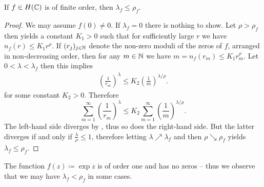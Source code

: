 \begin{theorem} \label{thm:inequality-order-exponent-of-convergence}
    If $f \in H(\mathbb{C})$ is of finite order, then $\lambda_f \leq \rho_f$.
\end{theorem}

\begin{proof}
    We may assume $f(0) \neq 0$. If $\lambda_f = 0$ there is nothing to show. Let $\rho > \rho_f$ then  yields a constant $K_1 > 0$ such that for sufficiently large $r$ we have $n_f(r) \leq K_1 r^{\rho}$. If $(r_j)_{j \in \mathbb{N}}$ denote the non-zero moduli of the zeros of $f$, arranged in non-decreasing order, then for any $m \in \mathbb{N}$ we have $m = n_f(r_m) \leq K_1 r_m^{\rho}$. Let $0 < \lambda < \lambda_f$ then this implies
    \begin{align*}
        \left( \frac{1}{r_m} \right)^{\lambda} \leq K_2 \left( \frac{1}{m} \right)^{\lambda/\rho}.
    \end{align*}
    for some constant $K_2 > 0$. Therefore
    \begin{equation*}
        \sum_{m=1}^\infty \left( \frac{1}{r_m} \right)^{\lambda} \leq K_2 \sum_{m=1}^\infty \left( \frac{1}{m} \right)^{\lambda/\rho}.
    \end{equation*}
    The left-hand side diverges by , thus so does the right-hand side. But the latter diverges if and only if $\frac{\lambda}{\rho} \leq 1$, therefore letting $\lambda \nearrow \lambda_f$ and then $\rho \searrow \rho_f$ yields $\lambda_f \leq \rho_f$.
\end{proof}

\begin{remark}
    The function $f(z) \coloneqq \exp z$ is of order one and has no zeros -- thus we observe that we may have $\lambda_f < \rho_f$ in some cases.
\end{remark}

\iffalse
\begin{example} \label{exm:exponent-of-convergence}
    Consider $f(z) \coloneqq \sin(z) \in H(\C)$, we want to calculate $\lambda_f$ and $\rho_f$. First, let $\lambda > 0$ and recall that $f$ has zeros at $(n \pi)_{n \in \Z}$. Since
    $$ \sum_{n \in \Z \setminus \{0\}} \frac{1}{\vert n \pi \vert^\lambda} = \frac{2}{\pi^\lambda} \sum_{n=1}^\infty \frac{1}{n^\lambda} $$
    is finite if and only if $\lambda > 1$, we obtain $\lambda_f = 1$. Furthermore, we have $\vert \sin(z) \vert \leq e^{\vert z \vert}$
    and therefore $M_f(r) \leq e^r$, whereby $\rho_f \leq 1$. Finally, \Cref{thm:inequality-order-exponent-of-convergence} concludes $\rho_f = 1$.
\end{example}
\fi
